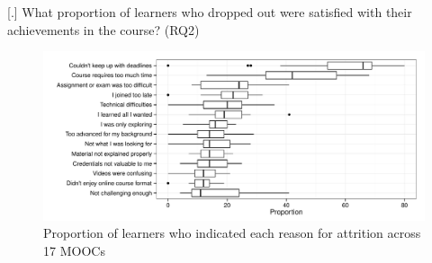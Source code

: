 \documentclass{sigchi}\usepackage[]{graphicx}\usepackage[]{color}
\makeatletter
\def\maxwidth{ %
  \ifdim\Gin@nat@width>\linewidth
    \linewidth
  \else
    \Gin@nat@width
  \fi
}
\newenvironment{knitrout}{}{} %
\makeatother
\begin{document}
[.] What proportion of learners who dropped out were satisfied with their achievements in the course? (RQ2)

\begin{knitrout}
\color{fgcolor}\begin{figure}[ht]

\includegraphics[width=\maxwidth]{figure/s1reason} \caption[Proportion of learners who indicated each reason for attrition across 17 MOOCs]{Proportion of learners who indicated each reason for attrition across 17 MOOCs\label{fig:s1reason}}
\end{figure}


\end{knitrout}
\end{document}
